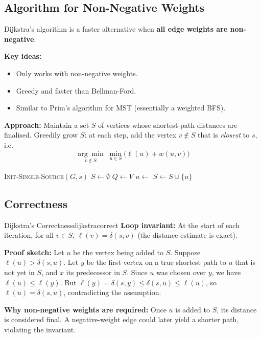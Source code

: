 \subsection{Algorithm for Non-Negative Weights}

Dijkstra's algorithm is a faster alternative when \textbf{all edge weights are non-negative}.

\textbf{Key ideas:}
\begin{itemize}[noitemsep]
  \item Only works with non-negative weights.
  \item Greedy and faster than Bellman-Ford.
  \item Similar to Prim's algorithm for MST (essentially a weighted BFS).
\end{itemize}

\textbf{Approach:} Maintain a set $S$ of vertices whose shortest-path distances are finalised.
Greedily grow $S$: at each step, add the vertex $v \notin S$ that is \emph{closest} to $s$, i.e.\
\[
  \underset{v \notin S}{\arg\min}\; \min_{u \in S}\bigl(\ell(u) + w(u,v)\bigr)
\]

\begin{algorithm}[H]
\caption{Dijkstra's Algorithm}
\begin{algorithmic}[1]
  \State \textsc{Init-Single-Source}$(G, s)$
  \State $S \gets \emptyset$
  \State $Q \gets V$ 
  \While{$Q \neq \emptyset$}
    \State $u \gets$ 
    \State $S \gets S \cup \{u\}$
      \State {}
        \State {}
      \EndIf
    \EndFor
  \EndWhile
\EndProcedure
\end{algorithmic}
\end{algorithm}

\subsection{Correctness}

\begin{theorem}{Dijkstra's Correctness}{dijkstracorrect}
\textbf{Loop invariant:} At the start of each iteration, for all $v \in S$,
$\ell(v) = \delta(s,v)$ (the distance estimate is exact).

\textbf{Proof sketch:} Let $u$ be the vertex being added to $S$. Suppose $\ell(u) > \delta(s,u)$.
Let $y$ be the first vertex on a true shortest path to $u$ that is not yet in $S$, and $x$ its
predecessor in $S$. Since $u$ was chosen over $y$, we have $\ell(u) \le \ell(y)$. But
$\ell(y) = \delta(s,y) \le \delta(s,u) \le \ell(u)$, so $\ell(u) = \delta(s,u)$,
contradicting the assumption.

\textbf{Why non-negative weights are required:} Once $u$ is added to $S$, its distance is
considered final. A negative-weight edge could later yield a shorter path, violating the invariant.
\end{theorem}

